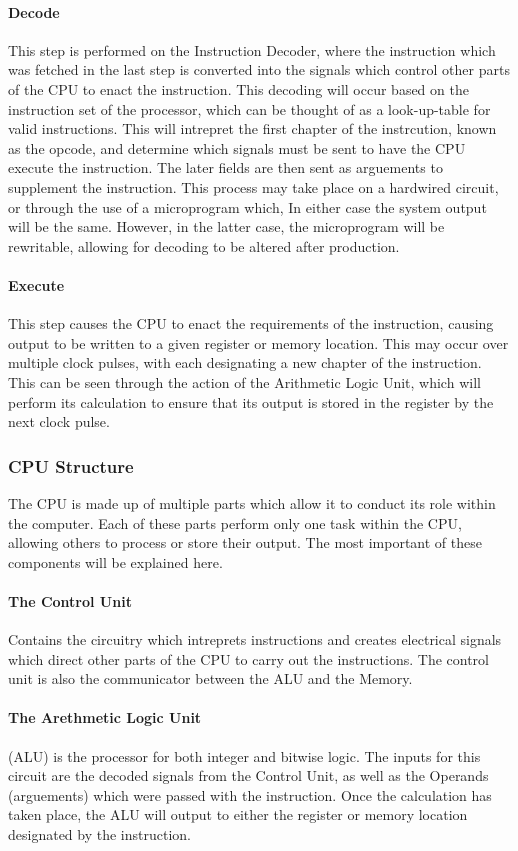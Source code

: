 \documentclass[a4paper,11pt]{book}
\begin{document}
				\paragraph{Decode}
					This step is performed on the Instruction Decoder, where the instruction which was fetched in the last step is converted into the signals which control other parts of the CPU to enact the instruction. 
					This decoding will occur based on the instruction set of the processor, which can be thought of as a look-up-table for valid instructions. 
					This will intrepret the first chapter of the instrcution, known as the opcode, and determine which signals must be sent to have the CPU execute the instruction. 
					The later fields are then sent as arguements to supplement the instruction. 
					This process may take place on a hardwired circuit, or through the use of a microprogram which, In either case the system output will be the same. 
					However, in the latter case, the microprogram will be rewritable, allowing for decoding to be altered after production. 
				\paragraph{Execute}
					This step causes the CPU to enact the requirements of the instruction, causing output to be written to a given register or memory location. 
					This may occur over multiple clock pulses, with each designating a new chapter of the instruction. 
					This can be seen through the action of the Arithmetic Logic Unit, which will perform its calculation to ensure that its output is stored in the register by the next clock pulse. 
			\subsubsection{CPU Structure}
				The CPU is made up of multiple parts which allow it to conduct its role within the computer. 
				Each of these parts perform only one task within the CPU, allowing others to process or store their output. 
				The most important of these components will be explained here. 
				\paragraph{The Control Unit}
					Contains the circuitry which intreprets instructions and creates electrical signals which direct other parts of the CPU to carry out the instructions. 
					The control unit is also the communicator between the ALU and the Memory.
				\paragraph{The Arethmetic Logic Unit}
					(ALU) is the processor for both integer and bitwise logic. 
					The inputs for this circuit are the decoded signals from the Control Unit, as well as the Operands (arguements) which were passed with the instruction. 
					Once the calculation has taken place, the ALU will output to either the register or memory location designated by the instruction. 
\end{document}
